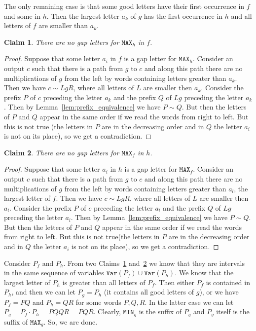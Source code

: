 \documentclass[11pt,letterpaper]{article}
\newtheorem{claim}{Claim}
\newcommand{\mmin}{\texttt{MIN}}
\newcommand{\mmax}{\texttt{MAX}}
\newcommand{\var}{\texttt{Var}}
\begin{document}
The only remaining case is that some good letters have their first occurrence in $f$ and some in $h$. Then the largest letter $a_k$ of $g$ has the first occurrence in $h$ and all letters of $f$ are smaller than $a_k$.

\begin{claim} \label{cl: h is good}
There are no gap letters for $\mmax_h$ in $f$.
\end{claim}

\begin{proof}
Suppose that some letter $a_i$ in $f$ is a gap letter for $\mmax_h$. Consider an output $c$ such that there is a path from $g$ to $c$ and along this path there are no multiplications of $g$ from the left by words containing letters greater than $a_k$. Then we have $c \sim LgR$, where all letters of $L$ are smaller then $a_k$. Consider the prefix $P$ of $c$ preceding the letter $a_k$ and the prefix $Q$ of $Lg$ preceding the letter $a_k$.
Then by Lemma~\ref{lem:prefix_equivalence} we have $P \sim Q$. But then the letters of $P$ and $Q$ appear in the same order if we read the words from right to left. But this is not true (the letters in $P$ are in the decreasing order and in $Q$ the letter $a_i$ is not on its place), so we get a contradiction.
\end{proof}

\begin{claim}\label{cl: f is good}
There are no gap letters for $\mmax_f$ in $h$.
\end{claim}

\begin{proof}
Suppose that some letter $a_i$ in $h$ is a gap letter for $\mmax_f$. Consider an output $c$ such that there is a path from $g$ to $c$ and along this path there are no multiplications of $g$ from the left by words containing letters greater than $a_l$, the largest letter of $f$. Then we have $c \sim LgR$, where all letters of $L$ are smaller then $a_l$. Consider the prefix $P$ of $c$ preceding the letter $a_l$ and the prefix $Q$ of $Lg$ preceding the letter $a_l$.
Then by Lemma~\ref{lem:prefix_equivalence} we have $P \sim Q$. But then the letters of $P$ and $Q$ appear in the same order if we read the words from right to left. But this is not true(the letters in $P$ are in the decreasing order and in $Q$ the letter $a_i$ is not on its place), so we get a contradiction.
\end{proof}

Consider $P_f$ and $P_h$. From two Claims~\ref{cl: h is good} and~\ref{cl: f is good} we know that they are intervals in the same sequence of variables $\var(P_f)\cup \var(P_h)$. We know that the largest letter of $P_h$ is greater than all letters of $P_f$. Then either $P_f$ is contained in $P_h$, and then we can let $P_g=P_h$ (it contains all good letters of $g$), or we have $P_f =PQ$ and $P_h=QR$ for some words $P, Q, R$. In the latter case we can let $P_g = P_f \cdot P_h = PQQR=PQR$. Clearly, $\mmin_g$ is the suffix of $P_g$ and $P_g$ itself is the suffix of $\mmax_g$. So, we are done.
\end{document}
